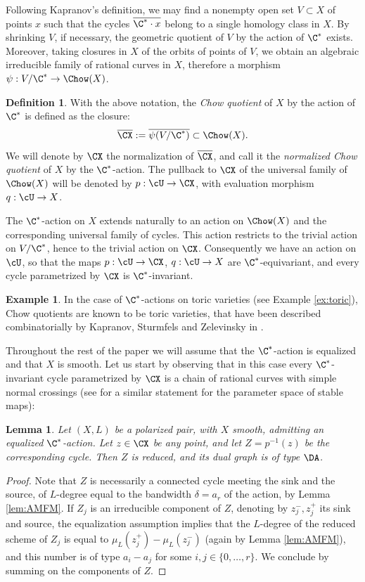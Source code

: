 \documentclass[reqno]{amsproc}
\newtheorem{lemma}[theorem]{Lemma}
\theoremstyle{definition}
\newtheorem{definition}[theorem]{Definition}
\newtheorem{example}[theorem]{Example}
\begin{document}
Following Kapranov's definition,  we may find a nonempty open set $V\subset X$ of points $x$ such that the cycles $\overline{\C^*\cdot x}$ belong to a single homology class in $X$. By shrinking $V$, if necessary, the geometric quotient of $V$ by the action of $\C^*$ exists. Moreover, taking closures in $X$ of the orbits of points of $V$, we obtain an algebraic irreducible family of rational curves in $X$, therefore a morphism $\psi:V/\C^*\to \Chow(X)$.

\begin{definition}
With the above notation, the {\em Chow quotient} of $X$ by the action of $\C^*$ is defined as the closure:
$$
\overline{\CX}:=\overline{\psi(V/\C^*)}\subset \Chow(X).
$$
We will denote by $\CX$ the normalization of $\overline{\CX}$, and call it the {\em normalized Chow quotient} of $X$ by the $\C^*$-action. 
The pullback to $\CX$ of the universal family of $\Chow(X)$ will be denoted by $p:\cU\to \CX$, with evaluation morphism $q:\cU\to X$.
\end{definition}

The  $\C^*$-action on $X$ extends naturally to an action on $\Chow(X)$ and the corresponding universal family of cycles. This action restricts to the trivial action on $V/\C^*$, hence to the trivial action on $\CX$. Consequently we have an action on $\cU$, so that the maps $p:\cU\to\CX$, $q:\cU\to X$ are $\C^*$-equivariant, and every cycle parametrized by $\CX$ is $\C^*$-invariant. 

\begin{example}\label{ex:toric2}
In the case of $\C^*$-actions on toric varieties (see Example \ref{ex:toric}), Chow quotients are known to be toric varieties, that have been described combinatorially by Kapranov, Sturmfels and Zelevinsky in \cite{KSZ}. 
\end{example}

Throughout the rest of the paper we will assume that  the  $\C^*$-action is  equalized and that $X$ is smooth. Let us start by observing that in this case every $\C^*$-invariant cycle parametrized by $\CX$ is a chain of rational curves with simple normal crossings
(see \cite[Lemma 3.12]{MMW} for a similar statement for the parameter space of stable maps):

\begin{lemma}\label{lem:reduced}
Let $(X,L)$ be a polarized pair, with $X$ smooth, admitting an equalized $\C^*$-action. 
Let $z\in \CX$ be any point, and let $Z=p^{-1}(z)$ be the corresponding cycle. 
Then $Z$ is reduced, and its dual graph 
 is of type $\DA$. 
\end{lemma}
\begin{proof}
Note that $Z$ is necessarily a connected cycle meeting the sink and the source, of $L$-degree equal to the bandwidth $\delta=a_r$ of the action, by Lemma \ref{lem:AMFM}. If $Z_j$ is an irreducible component of $Z$, denoting by $z_j^-,z_j^+$ its sink and source, the equalization assumption implies that the $L$-degree of the reduced scheme of $Z_j$ is equal to $\mu_L(z_j^+)-\mu_L(z_j^-)$ (again by Lemma \ref{lem:AMFM}), and this number is of type $a_{i}-a_{j}$ for some $i,j\in\{0,\dots,r\}$. We conclude by summing on the components of $Z$.
\end{proof}
\end{document}
